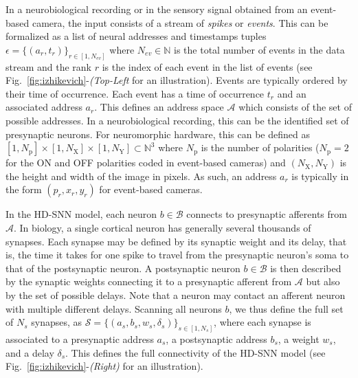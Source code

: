 \documentclass[default]{sn-jnl}%
\theoremstyle{thmstyleone}%
\theoremstyle{thmstyletwo}%
\theoremstyle{thmstylethree}%
\newcommand{\seeFig}[1]{see Fig.~\ref{fig:#1}}%
\newcommand{\presynaddr}{a} %
\newcommand{\postsynaddr}{b} %
\newcommand{\numevent}{N_{ev}} %
\newcommand{\presynaddrspace}{\mathcal{A}} %
\newcommand{\postsynaddrspace}{\mathcal{B}} %
\newcommand{\Npol}{N_\text{p}} %
\newcommand{\arank}{r} %
\newcommand{\synapse}{\mathcal{S}} %
\newcommand{\synapticweight}{w} %
\newcommand{\synapticdelay}{\delta} %
\newcommand{\ranksyn}{s} %
\newcommand{\Nsyn}{N_{s}} %
\newcommand{\timev}{t} %
\newcommand{\polev}{p} %
\newcommand{\event}{\epsilon} %
\newcommand{\Nx}{N_\text{X}}
\newcommand{\Ny}{N_\text{Y}}
\begin{document}
In a neurobiological recording or in the sensory signal obtained from an event-based camera, the input consists of a stream of \emph{spikes} or \emph{events}. This can be formalized as a list of neural addresses and timestamps tuples $\event = \{(\presynaddr_\arank, \timev_\arank)\}_{\arank \in [1,\numevent]}$ where $\numevent \in \mathbb{N} $ is the total number of events in the data stream and the rank $\arank$ is the index of each event in the list of events (\seeFig{izhikevich}-\textit{(Top-Left} for an illustration). Events are typically ordered by their time of occurrence. Each event has a time of occurrence $\timev_\arank$ and an associated address $\presynaddr_\arank$. This defines an address space $\presynaddrspace$ which consists of the set of possible addresses. In a neurobiological recording, this can be the identified set of presynaptic neurons. For neuromorphic hardware, this can be defined as $[1, \Npol] \times [1, \Nx]\times[1, \Ny] \subset \mathbb{N}^3$ where $\Npol$ is the number of polarities ($\Npol=2$ for the ON and OFF polarities coded in event-based cameras) and $(\Nx, \Ny)$ is the height and width of the image in pixels. As such, an address $\presynaddr_\arank$ is typically in the form $(\polev_\arank, x_\arank, y_\arank)$ for event-based cameras.

In the HD-SNN model, each neuron $\postsynaddr \in \postsynaddrspace$ connects to presynaptic afferents from $\presynaddrspace$. In biology, a single cortical neuron has generally several thousands of synapses. Each synapse may be defined by its synaptic weight and its delay, that is, the time it takes for one spike to travel from the presynaptic neuron's soma to that of the postsynaptic neuron. A postsynaptic neuron $\postsynaddr \in \postsynaddrspace$ is then described by the synaptic weights connecting it to a presynaptic afferent from $\presynaddrspace$ but also by the set of possible delays. Note that a neuron may contact an afferent neuron with multiple different delays. Scanning all neurons $\postsynaddr$, we thus define the full set of $\Nsyn$ synapses, 
as $\synapse = \{(\presynaddr_\ranksyn, \postsynaddr_\ranksyn, \synapticweight_\ranksyn, \synapticdelay_\ranksyn)\}_{\ranksyn \in [1,\Nsyn]}$, where each synapse is associated to a presynaptic address $\presynaddr_\ranksyn$, a postsynaptic address $\postsynaddr_\ranksyn$, a weight $\synapticweight_\ranksyn$, and a delay $\synapticdelay_\ranksyn$. This defines the full connectivity of the HD-SNN model (\seeFig{izhikevich}-\textit{(Right)} for an illustration). 
\end{document}

